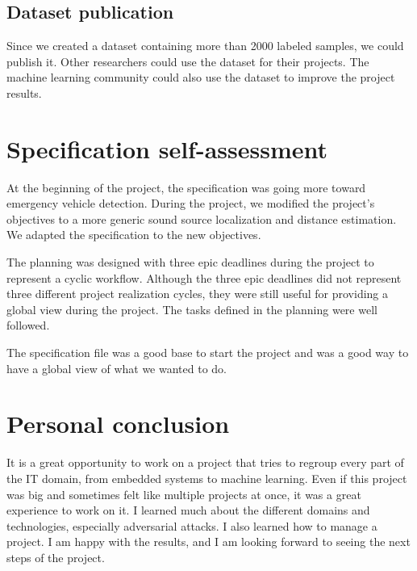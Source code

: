 \subsection{Dataset publication}

Since we created a dataset containing more than 2000 labeled samples, we could publish it. Other researchers could use the dataset for their projects. The machine learning community could also use the dataset to improve the project results.

\section{Specification self-assessment}

At the beginning of the project, the specification was going more toward emergency vehicle detection. During the project, we modified the project's objectives to a more generic sound source localization and distance estimation. We adapted the specification to the new objectives. 

The planning was designed with three epic deadlines during the project to represent a cyclic workflow. Although the three epic deadlines did not represent three different project realization cycles, they were still useful for providing a global view during the project. The tasks defined in the planning were well followed.

The specification file was a good base to start the project and was a good way to have a global view of what we wanted to do.

\section{Personal conclusion}

It is a great opportunity to work on a project that tries to regroup every part of the IT domain, from embedded systems to machine learning. Even if this project was big and sometimes felt like multiple projects at once, it was a great experience to work on it. I learned much about the different domains and technologies, especially adversarial attacks. I also learned how to manage a project. I am happy with the results, and I am looking forward to seeing the next steps of the project.
